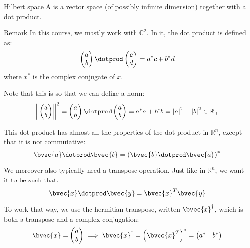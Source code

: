 \documentclass[a4paper]{article}
\begin{document}
\begin{parag}{Hilbert space}
    A  is a vector space (of possibly infinite dimension) together with a dot product.

    \begin{subparag}{Remark}
        In this course, we mostly work with $\mathbb{C}^2$. In it, the dot product is defined as: 
        \[\begin{pmatrix} a \\ b \end{pmatrix} \dotprod \begin{pmatrix} c \\ d \end{pmatrix} = a^* c + b^* d\]
        where $x^*$ is the complex conjugate of $x$.

        Note that this is so that we can define a norm: 
        \[\left\|\begin{pmatrix} a \\ b \end{pmatrix} \right\|^2 = \begin{pmatrix} a \\ b \end{pmatrix} \dotprod \begin{pmatrix} a \\ b \end{pmatrix} = a^* a + b^* b = \left|a\right|^2 + \left|b\right|^2 \in \mathbb{R}_+\]

        This dot product has almost all the properties of the dot product in $\mathbb{R}^n$, except that it is not commutative: 
        \[\bvec{a} \dotprod \bvec{b} = \left(\bvec{b} \dotprod \bvec{a}\right)^*\]

        We moreover also typically need a transpose operation. Just like in $\mathbb{R}^n$, we want it to be such that:
        \[\bvec{x} \dotprod \bvec{y} = \bvec{x}^T \bvec{y}\]

        To work that way, we use the hermitian transpose, written $\bvec{x}^{\dagger}$, which is both a transpose and a complex conjugation: 
        \[\bvec{x} = \begin{pmatrix} a \\ b \end{pmatrix} \implies \bvec{x}^{\dagger} = \left(\bvec{x}^T\right)^* = \begin{pmatrix} a^* & b^* \end{pmatrix} \]
    \end{subparag}
\end{parag}
\end{document}
